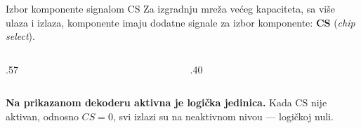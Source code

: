 \begin{frame}[label=03-s008]{Izbor komponente signalom CS}
Za izgradnju mreža većeg kapaciteta, sa više ulaza i izlaza, komponente imaju
dodatne signale za izbor komponente: \textbf{CS} (\emph{chip select}).
\par
\begingroup
\def\DEgateScale{.62}\def\DEtapDelta{.45}\def\DEnegSOne{2.1}\def\DEnegSZero{1.2}\def\DEbottomFrame{-.75}
\def\DEdekoderY{0.69}
\def\DEcs{1}\def\DEokvir{1}\def\DEnaziv{Dekoder}\def\DEtip{2/4}\def\DEulaz{CS}
\begin{columns}[c,onlytextwidth]
\begin{column}{.57\textwidth}\centering

\end{column}
\begin{column}{.40\textwidth}\centering

\end{column}
\end{columns}
\par\endgroup
\par\par\vspace{1mm}
\textbf{Na prikazanom dekoderu aktivna je logička jedinica.}
Kada CS nije aktivan, odnosno \(CS=0\), svi izlazi su na neaktivnom nivou --- logičkoj nuli.
\par\vspace{1mm}
\end{frame}
